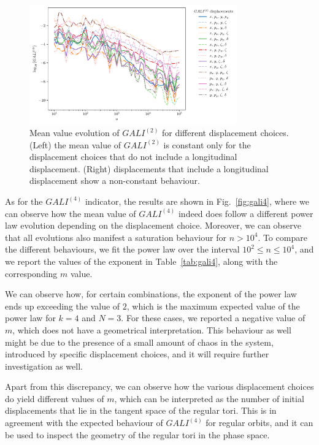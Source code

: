 \begin{figure}
    \centering
    \includegraphics[width=0.8\textwidth]{6_lhc_dynamic_indicators/figs/evolution_gali_4_stable.pdf}
    \caption{Mean value evolution of $GALI^{(2)}$ for different displacement choices. (Left) the mean value of $GALI^{(2)}$ is constant only for the displacement choices that do not include a longitudinal displacement. (Right) displacements that include a longitudinal displacement show a non-constant behaviour.}
    \label{fig:gali2}
\end{figure}

As for the $GALI^{(4)}$ indicator, the results are shown in Fig.~\ref{fig:gali4}, where we can observe how the mean value of $GALI^{(4)}$ indeed does follow a different power law evolution depending on the displacement choice. Moreover, we can observe that all evolutions also manifest a saturation behaviour for $n>10^4$. To compare the different behaviours, we fit the power law over the interval $10^2\leq n \leq 10^4$, and we report the values of the exponent in Table~\ref{tab:gali4}, along with the corresponding $m$ value.

We can observe how, for certain combinations, the exponent of the power law ends up exceeding the value of $2$, which is the maximum expected value of the power law for $k=4$ and $N=3$. For these cases, we reported a negative value of $m$, which does not have a geometrical interpretation. This behaviour as well might be due to the presence of a small amount of chaos in the system, introduced by specific displacement choices, and it will require further investigation as well.

Apart from this discrepancy, we can observe how the various displacement choices do yield different values of $m$, which can be interpreted as the number of initial displacements that lie in the tangent space of the regular tori. This is in agreement with the expected behaviour of $GALI^{(4)}$ for regular orbits, and it can be used to inspect the geometry of the regular tori in the phase space.

